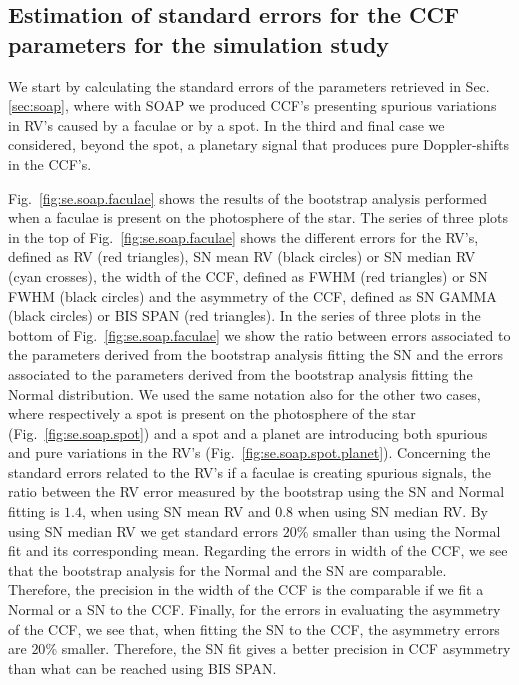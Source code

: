 \documentclass[11pt, oneside]{article}
\begin{document}
\subsection{Estimation of standard errors for the CCF parameters for the simulation study} \label{sec:bootstrap_soap}

We start by calculating the standard errors of the parameters retrieved in Sec. \ref{sec:soap}, where with SOAP we produced CCF's presenting spurious variations in RV's caused by a faculae or by a spot. In the third and final case we considered, beyond the spot, a planetary signal that produces pure Doppler-shifts in the CCF's.

Fig.~\ref{fig:se.soap.faculae} shows the results of the bootstrap analysis performed when a faculae is present on the photosphere of the star. The series of three plots in the top of Fig.~\ref{fig:se.soap.faculae} shows the different errors for the RV's, defined as RV (red triangles), SN mean RV (black circles) or SN median RV (cyan crosses), the width of the CCF, defined as FWHM (red triangles) or SN FWHM (black circles) and the asymmetry of the CCF, defined as SN GAMMA (black circles) or BIS SPAN (red triangles). In the series of three plots in the bottom of Fig.~\ref{fig:se.soap.faculae} we show the ratio between errors associated to the parameters derived from the bootstrap analysis fitting the SN and the errors associated to the parameters derived from the bootstrap analysis fitting the Normal distribution.  We used the same notation also for the other two cases, where respectively a spot is present on the photosphere of the star (Fig.~\ref{fig:se.soap.spot}) and a spot and a planet are introducing both spurious and pure variations in the RV's (Fig.~\ref{fig:se.soap.spot.planet}). Concerning the standard errors related to the RV's if a faculae is creating spurious signals, the ratio between the RV error measured by the bootstrap using the SN and Normal fitting is $1.4$, when using SN mean RV and $0.8$ when using SN median RV. By using SN median RV we get standard errors $20\%$ smaller than using the Normal fit and its corresponding mean. Regarding the errors in width of the CCF, we see that the bootstrap analysis for the Normal and the SN are comparable. Therefore, the precision in the width of the CCF is the comparable if we fit a Normal or a SN to the CCF. Finally, for the errors in evaluating the asymmetry of the CCF, we see that, when fitting the SN to the CCF, the asymmetry errors are $20\%$ smaller. Therefore, the SN fit gives a better precision in CCF asymmetry than what can be reached using BIS SPAN.
\end{document}
